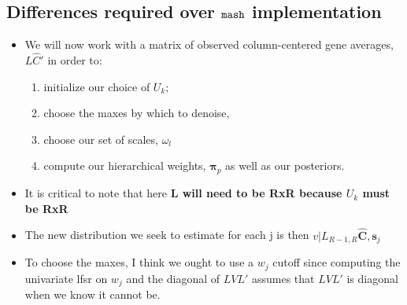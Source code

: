\documentclass[11pt, oneside]{article}   	%
\newcommand{\Norm}{{\mathcal{N}}} %
\newcommand{\ceff}{\bm{C}}
\newcommand{\chat}{\bm{\hat{C}}}
\newcommand{\vb}{\bm{v}}
\def\mash{{\tt mash}}
\begin{document}
\begin{itemize}
\section{Differences required over $\mash$ implementation}

\begin{itemize}
\item We will now work with a matrix of observed column-centered gene averages, $L \hat{C} '$ in order to:
\begin{enumerate}
	\item initialize our choice of $U_{k}$;
	\item  choose the maxes by which to denoise, 
	\item choose our set of scales, $\omega_{l}$
	\item compute our hierarchical weights, $\bm{\pi}_{p}$ as well as our posteriors. 
\end{enumerate}
\item It is critical to note that here \textbf{L will need to be RxR because $U_{k}$ must be RxR}
\item The new distribution we seek to estimate for each j is then $v | L_{R-1,R} \chat , \bm{s}_{j}$
\item To choose the maxes, I think we ought to use a $w_{j}$ cutoff since computing the univariate lfsr on $w_{j}$ and the diagonal of $LVL'$ assumes that $LVL'$ is diagonal when we know it cannot be.
\end{itemize}

%


\end{itemize}
\end{document}
